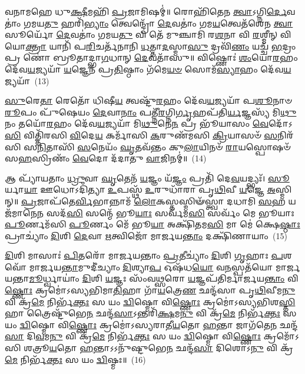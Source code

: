 𑌵𑌨𑌾𑌮𑌹𑍇 𑌧𑍁\-\ul{𑌕𑍍𑌷𑍀}\-𑌮𑌹𑌿᳴ \ul{𑌪𑍍𑌰}\-𑌜𑌾𑌮𑌿𑌷𑌮𑍍॑॥ 𑌰𑍋𑌹𑌿᳴𑌤𑍇𑌨 \ul{𑌤𑍍𑌵𑌾}\-\-𑌽𑌗𑍍𑌨𑌿\-\ul{𑌰𑍍𑌦𑍇}\-𑌵𑌤𑌾𑌂॑ 𑌗𑌮𑌯\-\ul{𑌤𑍁} 𑌹𑌰𑌿᳴\-\ul{𑌭𑍍𑌯𑌾𑌂} 𑌤𑍍𑌵𑍇𑌨𑍍𑌦𑍍𑌰𑍋᳴ \ul{𑌦𑍇}\-𑌵𑌤𑌾𑌂॑ 𑌗𑌮\-\ul{𑌯}\-𑌤𑍍𑌵𑍇𑌤᳴𑌶𑍇𑌨 \ul{𑌤𑍍𑌵𑌾} 𑌸𑍂𑌰𑍍𑌯𑍋᳴ \ul{𑌦𑍇}\-𑌵𑌤𑌾𑌂॑ 𑌗𑌮𑌯\-\ul{𑌤𑍁} 𑌵𑌿 𑌤𑍇᳴ 𑌮𑍁𑌞𑍍𑌚𑌾𑌮𑌿 𑌰\-\ul{𑌶}\-𑌨𑌾 𑌵𑌿 \ul{𑌰}\-𑌶𑍍𑌮𑍀𑌨𑍍 𑌵𑌿 𑌯𑍋\-\ul{𑌕𑍍𑌤𑍍𑌰𑌾} 𑌯𑌾𑌨𑌿᳴ 𑌪\-\ul{𑌰𑌿}\-𑌚𑌰𑍍𑌤᳴𑌨𑌾𑌨𑌿 \ul{𑌧}\-𑌤𑍍𑌤𑌾\-\ul{𑌦}\-𑌸𑍍𑌮𑌾\-\ul{𑌸𑍁} 𑌦𑍍𑌰𑌵𑌿᳴\-\ul{𑌣𑌂} 𑌯𑌚𑍍𑌚᳴ \ul{𑌭}\-𑌦𑍍𑌰𑌂 𑌪𑍍𑌰 𑌣𑍋॑ 𑌬𑍍𑌰𑍂𑌤𑌾𑌦𑍍𑌭𑌾\-\ul{𑌗}\-𑌧𑌾𑌨𑍍 \ul{𑌦𑍇}\-𑌵𑌤𑌾᳴𑌸𑍁॥ 𑌵𑌿𑌷𑍍𑌣𑍋𑌃॑ \ul{𑌶𑌂}\-𑌯𑍋\-\ul{𑌰}\-𑌹𑌂 𑌦𑍇᳴𑌵\-\ul{𑌯}\-𑌜𑍍𑌯𑌯𑌾᳴ \ul{𑌯}\-𑌜𑍍𑌞𑍇𑌨᳴ 𑌪𑍍𑌰\-\ul{𑌤𑌿}\-𑌷𑍍𑌠𑌾𑌂 𑌗᳴𑌮𑍇\-\ul{𑌯}\-\-\ul{𑍞} 𑌸𑍋𑌮᳴\-\ul{𑌸𑍍𑌯𑌾}\-𑌹𑌂 𑌦𑍇᳴𑌵\-\ul{𑌯}\-𑌜𑍍𑌯𑌯𑌾᳴~(13)

\-\ul{𑌸𑍁}\-𑌰𑍇\-\ul{𑌤𑌾} 𑌰𑍇𑌤𑍋᳴ 𑌧𑌿𑌷𑍀\-\ul{𑌯} 𑌤𑍍𑌵𑌷𑍍𑌟𑍁᳴\-\ul{𑌰}\-𑌹𑌂 𑌦𑍇᳴𑌵\-\ul{𑌯}\-𑌜𑍍𑌯𑌯𑌾᳴ 𑌪\-\ul{𑌶𑍂}\-𑌨𑌾𑍞 \ul{𑌰𑍂}\-𑌪𑌂 𑌪𑍁᳴𑌷𑍇𑌯𑌂 \ul{𑌦𑍇}\-𑌵𑌾\-\ul{𑌨𑌾𑌂} 𑌪𑌤𑍍𑌨𑍀᳴\-\ul{𑌰}\-𑌗𑍍𑌨𑌿\-\ul{𑌰𑍍𑌗𑍃}\-𑌹𑌪᳴𑌤𑌿\-\ul{𑌰𑍍𑌯}\-𑌜𑍍𑌞𑌸𑍍𑌯᳴ 𑌮𑌿\-\ul{𑌥𑍁}\-𑌨𑌂 𑌤𑌯𑍋᳴\-\ul{𑌰}\-𑌹𑌂 𑌦𑍇᳴𑌵\-\ul{𑌯}\-𑌜𑍍𑌯𑌯𑌾᳴ 𑌮𑌿\-\ul{𑌥𑍁}\-𑌨𑍇\-\ul{𑌨} 𑌪𑍍𑌰 𑌭𑍂᳴𑌯𑌾𑌸𑌂 \ul{𑌵𑍇}\-𑌦𑍋᳴\-𑌽\-\ul{𑌸𑌿} 𑌵𑌿𑌤𑍍𑌤𑌿᳴𑌰𑌸𑌿 \ul{𑌵𑌿}\-𑌦𑍇\-\ul{𑌯} 𑌕𑌰𑍍𑌮𑌾᳴𑌸𑌿 \ul{𑌕}\-𑌰𑍁𑌣᳴𑌮𑌸𑌿 \ul{𑌕𑍍𑌰𑌿}\-𑌯𑌾𑌸𑍞᳴ \ul{𑌸}\-𑌨𑌿𑌰᳴𑌸𑌿 𑌸\-\ul{𑌨𑌿}\-𑌤𑌾𑌸𑌿᳴ \ul{𑌸}\-𑌨𑍇𑌯𑌂᳴ \ul{𑌘𑍃}\-𑌤𑌵᳴𑌨𑍍𑌤𑌂 𑌕𑍁\-\ul{𑌲𑌾}\-𑌯𑌿𑌨𑍞᳴ \ul{𑌰𑌾}\-𑌯𑌸𑍍𑌪𑍋𑌷𑍞᳴ 𑌸\-\ul{𑌹}\-𑌸𑍍𑌰𑌿𑌣𑌂᳴ \ul{𑌵𑍇}\-𑌦𑍋 𑌦᳴𑌦𑌾𑌤𑍁 \ul{𑌵𑌾}\-𑌜𑌿𑌨𑌮𑍍॑॥~(14)

{\anuvakamend[{𑌇𑌨𑍍𑌦𑍍𑌰᳴\-\ul{𑌸𑍍𑌯𑌾}\-𑌹𑌮𑌿𑌨𑍍𑌦𑍍𑌰᳴𑌵\-\ul{𑌨𑍍𑌤𑌃} 𑌸𑍋𑌮᳴\-\ul{𑌸𑍍𑌯𑌾}\-𑌹𑌂 𑌦𑍇᳴𑌵\-\ul{𑌯}\-𑌜𑍍𑌯\-\ul{𑌯𑌾} 𑌚𑌤𑍁᳴𑌶𑍍𑌚𑌤𑍍𑌵𑌾𑌰𑌿𑍞𑌶𑌚𑍍𑌚}]}%

𑌆 𑌪𑍍𑌯𑌾᳴𑌯𑌤𑌾𑌂 \ul{𑌧𑍍𑌰𑍁}\-𑌵𑌾 \ul{𑌘𑍃}\-𑌤𑍇𑌨᳴ \ul{𑌯}\-𑌜𑍍𑌞𑌂 𑌯᳴\-\ul{𑌜𑍍𑌞𑌂} 𑌪𑍍𑌰𑌤𑌿᳴ 𑌦𑍇\-\ul{𑌵}\-𑌯𑌦𑍍𑌭𑍍𑌯𑌃᳴। \ul{𑌸𑍂}\-𑌰𑍍𑌯𑌾\-\ul{𑌯𑌾} 𑌊𑌧𑍋\-𑌽𑌦𑌿᳴𑌤𑍍𑌯𑌾 \ul{𑌉}\-𑌪𑌸𑍍𑌥᳴ \ul{𑌉}\-𑌰𑍁𑌧𑌾᳴𑌰𑌾 𑌪𑍃\-\ul{𑌥𑌿}\-𑌵𑍀 \ul{𑌯}\-𑌜𑍍𑌞𑍇 \ul{𑌅}\-𑌸𑍍𑌮𑌿𑌨𑍍॥ \ul{𑌪𑍍𑌰}\-𑌜𑌾𑌪᳴𑌤𑍇\-\ul{𑌰𑍍𑌵𑌿}\-𑌭𑌾𑌨𑍍𑌨𑌾𑌮᳴ \ul{𑌲𑍋}\-𑌕𑌸𑍍𑌤𑌸𑍍𑌮𑌿𑍟᳴𑌸𑍍𑌤𑍍𑌵𑌾 𑌦𑌧𑌾𑌮𑌿 \ul{𑌸}\-𑌹 𑌯𑌜᳴𑌮𑌾𑌨𑍇\-\ul{𑌨} 𑌸𑌦᳴\-\ul{𑌸𑌿} 𑌸𑌨𑍍𑌮𑍇᳴ 𑌭𑍂\-\ul{𑌯𑌾𑌃} 𑌸𑌰𑍍𑌵᳴𑌮\-\ul{𑌸𑌿} 𑌸𑌰𑍍𑌵𑌂᳴ 𑌮𑍇 𑌭𑍂𑌯𑌾𑌃 \ul{𑌪𑍂}\-𑌰𑍍𑌣𑌮᳴𑌸𑌿 \ul{𑌪𑍂}\-𑌰𑍍𑌣𑌂 𑌮𑍇᳴ 𑌭𑍂\-\ul{𑌯𑌾} 𑌅𑌕𑍍𑌷𑌿᳴𑌤𑌮\-\ul{𑌸𑌿} 𑌮𑌾 𑌮𑍇॑ 𑌕𑍍𑌷𑍇\-\ul{𑌷𑍍𑌠𑌾𑌃} 𑌪𑍍𑌰𑌾𑌚𑍍𑌯𑌾𑌂॑ \ul{𑌦𑌿}\-𑌶𑌿 \ul{𑌦𑍇}\-𑌵𑌾 \ul{𑌋}\-𑌤𑍍𑌵𑌿𑌜𑍋᳴ 𑌮𑌾𑌰𑍍𑌜𑌯\-\ul{𑌨𑍍𑌤𑌾𑌂} 𑌦𑌕𑍍𑌷𑌿᳴𑌣𑌾𑌯𑌾𑌂~(15)

\-\ul{𑌦𑌿}\-𑌶𑌿 𑌮𑌾𑌸𑌾𑌃॑ \ul{𑌪𑌿}\-𑌤𑌰𑍋᳴ 𑌮𑌾𑌰𑍍𑌜𑌯𑌨𑍍𑌤𑌾𑌂 \ul{𑌪𑍍𑌰}\-𑌤𑍀𑌚𑍍𑌯𑌾𑌂॑ \ul{𑌦𑌿}\-𑌶𑌿 \ul{𑌗𑍃}\-𑌹𑌾𑌃 \ul{𑌪}\-𑌶𑌵𑍋᳴ 𑌮𑌾𑌰𑍍𑌜𑌯\-\ul{𑌨𑍍𑌤𑌾}\-𑌮𑍁𑌦𑍀॑𑌚𑍍𑌯𑌾𑌂 \ul{𑌦𑌿}\-𑌶𑍍𑌯𑌾\-\ul{𑌪} 𑌓𑌷᳴𑌧\-\ul{𑌯𑍋} 𑌵\-\ul{𑌨}\-𑌸𑍍𑌪𑌤᳴𑌯𑍋 𑌮𑌾𑌰𑍍𑌜𑌯𑌨𑍍𑌤𑌾\-\ul{𑌮𑍂}\-𑌰𑍍𑌧𑍍𑌵𑌾𑌯𑌾𑌂॑ \ul{𑌦𑌿}\-𑌶𑌿 \ul{𑌯}\-𑌜𑍍𑌞𑌃 𑌸𑌂᳴𑌵\-\ul{𑌥𑍍𑌸}\-𑌰𑍋 \ul{𑌯}\-𑌜𑍍𑌞𑌪᳴𑌤𑌿𑌰𑍍𑌮𑌾𑌰𑍍𑌜𑌯\-\ul{𑌨𑍍𑌤𑌾𑌂} 𑌵𑌿\-\ul{𑌷𑍍𑌣𑍋𑌃} 𑌕𑍍𑌰𑌮𑍋॑\-𑌽𑌸𑍍𑌯𑌭𑌿𑌮𑌾\-\ul{𑌤𑌿}\-𑌹𑌾 𑌗𑌾᳴\-\ul{𑌯}\-𑌤𑍍𑌰𑍇\-\ul{𑌣} 𑌛𑌨𑍍𑌦᳴𑌸𑌾 𑌪𑍃\-\ul{𑌥𑌿}\-𑌵𑍀𑌮\-\ul{𑌨𑍁} 𑌵𑌿 𑌕𑍍𑌰᳴\-\ul{𑌮𑍇} 𑌨𑌿𑌰𑍍𑌭᳴\-\ul{𑌕𑍍𑌤𑌃} 𑌸 𑌯𑌂 \ul{𑌦𑍍𑌵𑌿}\-𑌷𑍍𑌮𑍋 𑌵𑌿\-\ul{𑌷𑍍𑌣𑍋𑌃} 𑌕𑍍𑌰𑌮𑍋॑\-𑌽𑌸𑍍𑌯𑌭𑌿𑌶\-\ul{𑌸𑍍𑌤𑌿}\-𑌹𑌾 𑌤𑍍𑌰𑍈𑌷𑍍𑌟𑍁᳴𑌭𑍇\-\ul{𑌨} 𑌛𑌨𑍍𑌦᳴\-\ul{𑌸𑌾}\-\-𑌽𑌨𑍍𑌤𑌰𑌿᳴\-\ul{𑌕𑍍𑌷}\-𑌮\-\ul{𑌨𑍁} 𑌵𑌿 𑌕𑍍𑌰᳴\-\ul{𑌮𑍇} 𑌨𑌿𑌰𑍍𑌭᳴\-\ul{𑌕𑍍𑌤𑌃} 𑌸 𑌯𑌂 \ul{𑌦𑍍𑌵𑌿}\-𑌷𑍍𑌮𑍋 𑌵𑌿\-\ul{𑌷𑍍𑌣𑍋𑌃} 𑌕𑍍𑌰𑌮𑍋॑\-𑌽𑌸𑍍𑌯𑌰𑌾𑌤𑍀\-\ul{𑌯}\-𑌤𑍋 \ul{𑌹}\-𑌨𑍍𑌤𑌾 𑌜𑌾𑌗᳴𑌤𑍇\-\ul{𑌨} 𑌛𑌨𑍍𑌦᳴\-\ul{𑌸𑌾} 𑌦𑌿\-\ul{𑌵}\-𑌮\-\ul{𑌨𑍁} 𑌵𑌿 𑌕𑍍𑌰᳴\-\ul{𑌮𑍇} 𑌨𑌿𑌰𑍍𑌭᳴\-\ul{𑌕𑍍𑌤𑌃} 𑌸 𑌯𑌂 \ul{𑌦𑍍𑌵𑌿}\-𑌷𑍍𑌮𑍋 𑌵𑌿\-\ul{𑌷𑍍𑌣𑍋𑌃} 𑌕𑍍𑌰𑌮𑍋᳴\-𑌽𑌸𑌿 𑌶𑌤𑍍𑌰𑍂\-\ul{𑌯}\-𑌤𑍋 \ul{𑌹}\-𑌨𑍍𑌤𑌾\-𑌽\-𑌽𑌨𑍁᳴𑌷𑍍𑌟𑍁𑌭𑍇\-\ul{𑌨} 𑌛𑌨𑍍𑌦᳴\-\ul{𑌸𑌾} 𑌦𑌿𑌶𑍋\-𑌽\-\ul{𑌨𑍁} 𑌵𑌿 𑌕𑍍𑌰᳴\-\ul{𑌮𑍇} 𑌨𑌿𑌰𑍍𑌭᳴\-\ul{𑌕𑍍𑌤𑌃} 𑌸 𑌯𑌂 \ul{𑌦𑍍𑌵𑌿}\-𑌷𑍍𑌮𑌃॥~(16)

